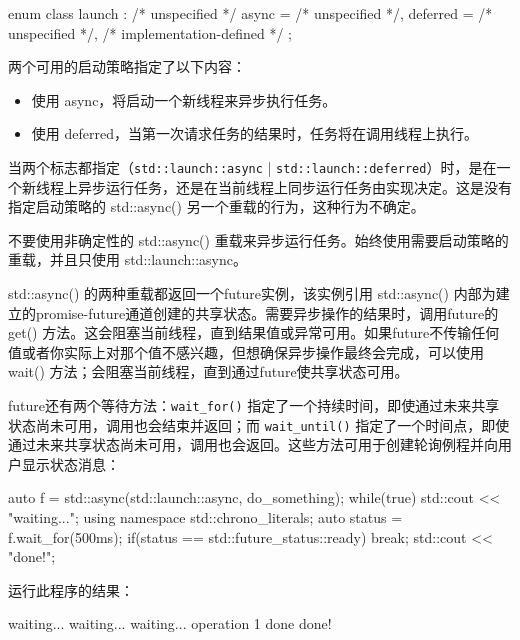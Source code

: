 \begin{cpp}
enum class launch : /* unspecified */
{
    async = /* unspecified */,
    deferred = /* unspecified */,
    /* implementation-defined */
};
\end{cpp}

两个可用的启动策略指定了以下内容：

\begin{itemize}
\item
使用 async，将启动一个新线程来异步执行任务。

\item
使用 deferred，当第一次请求任务的结果时，任务将在调用线程上执行。
\end{itemize}

当两个标志都指定（\verb|std::launch::async| | \verb|std::launch::deferred|）时，是在一个新线程上异步运行任务，还是在当前线程上同步运行任务由实现决定。这是没有指定启动策略的 std::async() 另一个重载的行为，这种行为不确定。

\begin{myTip}
不要使用非确定性的 std::async() 重载来异步运行任务。始终使用需要启动策略的重载，并且只使用 std::launch::async。
\end{myTip}

std::async() 的两种重载都返回一个future实例，该实例引用 std::async() 内部为建立的promise-future通道创建的共享状态。需要异步操作的结果时，调用future的 get() 方法。这会阻塞当前线程，直到结果值或异常可用。如果future不传输任何值或者你实际上对那个值不感兴趣，但想确保异步操作最终会完成，可以使用 wait() 方法；会阻塞当前线程，直到通过future使共享状态可用。

future还有两个等待方法：\verb|wait_for()| 指定了一个持续时间，即使通过未来共享状态尚未可用，调用也会结束并返回；而 \verb|wait_until()| 指定了一个时间点，即使通过未来共享状态尚未可用，调用也会返回。这些方法可用于创建轮询例程并向用户显示状态消息：

\begin{cpp}
auto f = std::async(std::launch::async, do_something);
while(true)
{
    std::cout << "waiting...\n";
    using namespace std::chrono_literals;
    auto status = f.wait_for(500ms);
    if(status == std::future_status::ready)
        break;
}
std::cout << "done!\n";
\end{cpp}

运行此程序的结果：

\begin{shell}
waiting...
waiting...
waiting...
operation 1 done
done!
\end{shell}

